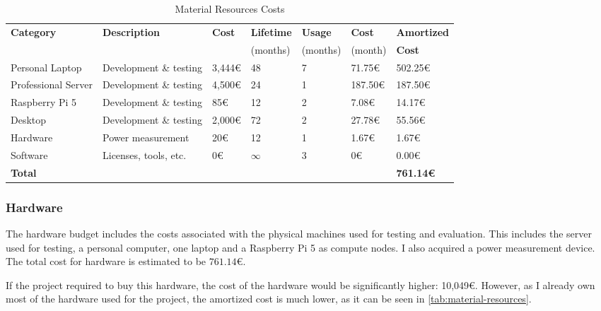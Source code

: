   \begin{table}[h]
    \vspace{1em}
    \noindent\hspace*{-1.7cm}
    \begin{adjustbox}{max width=\textwidth}
    \begin{tabular}{|lllllll|}
      \hline
      \multirow{1}{*}{\textbf{Category}} & \textbf{Description}   & \textbf{Cost} & \textbf{Lifetime} & \textbf{Usage} & \textbf{Cost} & \textbf{Amortized} \\
      & & & (months) & (months) & (month) & \textbf{Cost} \\
      \hline
      Personal Laptop       & Development \& testing  & 3,444€   & 48        & 7     & 71.75€     & 502.25€  \\
      Professional Server   & Development \& testing  & 4,500€   & 24        & 1     & 187.50€    & 187.50€  \\
      Raspberry Pi 5        & Development \& testing  & 85€      & 12        & 2     & 7.08€      & 14.17€   \\
      Desktop               & Development \& testing  & 2,000€   & 72        & 2     & 27.78€     & 55.56€   \\
      Hardware              & Power measurement       & 20€      & 12        & 1     & 1.67€      & 1.67€    \\
      Software              & Licenses, tools, etc.   & 0€       & $\infty$  & 3     & 0€         & 0.00€    \\
      \hline
      \textbf{Total}        & & & & & & \textbf{761.14€} \\
      \hline
    \end{tabular}
    \end{adjustbox}

    \caption{Material Resources Costs}
    \label{tab:material-resources}
  \end{table}

\subsubsection{Hardware}
The hardware budget includes the costs associated with the physical machines used for testing and evaluation. This includes the server used for testing, a personal computer, one laptop and a Raspberry Pi 5 as compute nodes. I also acquired a power measurement device. The total cost for hardware is estimated to be $761.14$€.

If the project required to buy this hardware, the cost of the hardware would be significantly higher: 10,049€. However, as I already own most of the hardware used for the project, the amortized cost is much lower, as it can be seen in \autoref{tab:material-resources}.

